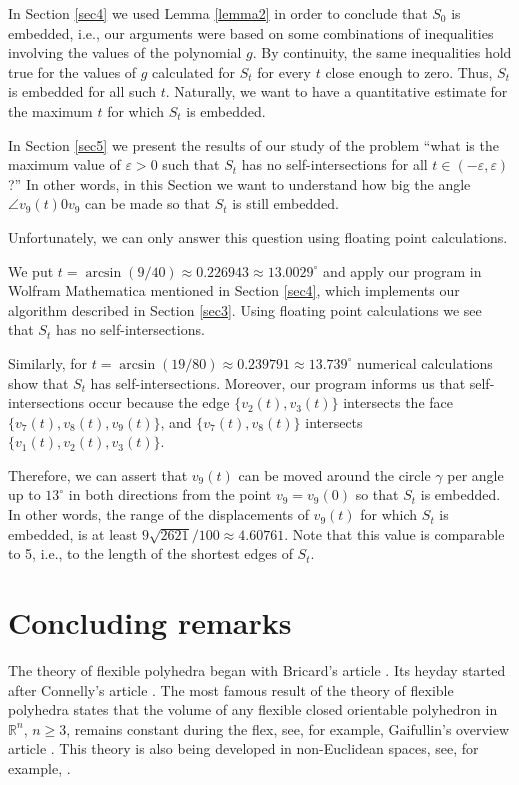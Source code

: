 \documentclass[12pt, reqno]{amsart}
\begin{document}
In Section \ref{sec4} we used Lemma \ref{lemma2} in order to conclude that
$S_0$
is embedded, i.e., our arguments were based on some combinations of inequalities
involving the values of the polynomial
$g$.
By continuity, the same inequalities hold true for the values of
$g$
calculated for
$S_t$
for every
$t$
close enough to zero.
Thus, 
$S_t$
is embedded for all such 
$t$.
Naturally, we want to have a quantitative estimate for the maximum 
$t$
for which 
$S_t$
is embedded.
 
In Section \ref{sec5} we present the results of our study of the problem 
``what is the maximum value of
$\varepsilon>0$
such that 
$S_t$ 
has no self-intersections for all 
$t\in (-\varepsilon, \varepsilon)$?''
In other words, in this Section we want to understand how big the angle 
$\angle v_9(t)0v_9$
can be made so that
$S_t$
is still embedded.

Unfortunately, we can only answer this question using floating point calculations.

We put 
$t = \arcsin(9/40) \approx 0.226943 \approx 13.0029^{\circ}$ 
and apply our program in Wolfram Mathematica mentioned in Section \ref{sec4},
which implements our algorithm described in Section \ref{sec3}.
Using floating point calculations we see that $S_t$ 
has no self-intersections.

Similarly, for 
$t = \arcsin(19/80) \approx 0.239791 \approx 13.739^{\circ}$ 
numerical calculations show that 
$S_t$ 
has self-intersections. 
Moreover, our program informs us that self-intersections occur because the edge 
$\{v_2(t),v_3(t)\}$ 
intersects the face 
$\{v_7(t),v_8(t),v_9(t)\}$, 
and  
$\{v_7(t),v_8(t)\}$ 
intersects 
$\{v_1(t),v_2(t),v_3(t)\}$.

Therefore, we can assert that 
$v_9(t)$
can be moved around the circle 
$\gamma$
per angle up to
$13^{\circ}$
in both directions from the point
$v_9=v_9(0)$
so that  
$S_t$
is embedded.
In other words, the range of the displacements of 
$v_9(t)$
for which 
$S_t$
is embedded,
is at least
$9\sqrt{2621}/100\approx 4.60761$.
Note that this value is comparable to 5, i.e., to the length of the shortest edges of
$S_t$. 

\section{Concluding remarks}\label{sec6}

The theory of flexible polyhedra began with Bricard's article \cite{Br97}.
Its heyday started after Connelly's article \cite{Co77}.
The most famous result  of the theory of flexible polyhedra states 
that the volume of any flexible closed orientable polyhedron in
$\mathbb{R}^n$, $n\geq 3$,
remains constant during the flex, see,
for example, Gaifullin's overview article \cite{Ga18}.
This theory is also being developed in non-Euclidean spaces, 
see, for example, \cite{Ga25}.
\end{document}
